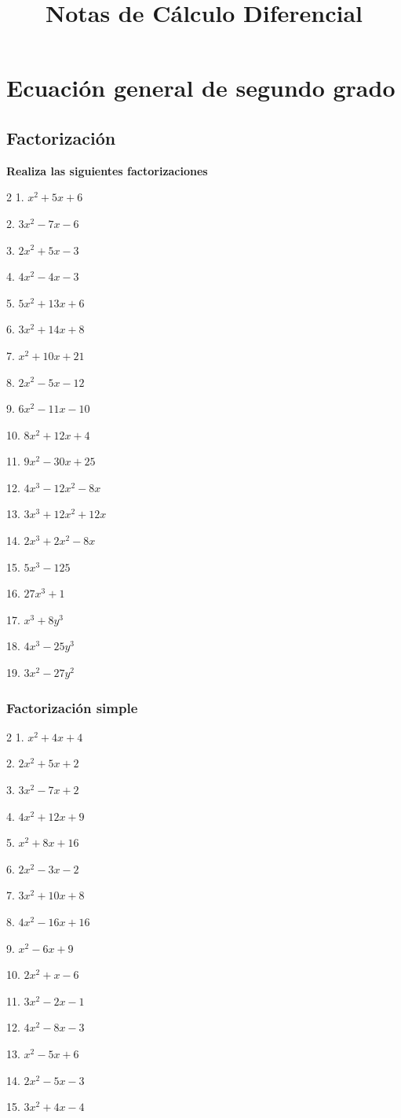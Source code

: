 \documentclass[12pt]{article}
\title{Notas de Cálculo Diferencial}
\author{}
\date{}
\begin{document}
\maketitle
\tableofcontents
\newpage

\section{Ecuación general de segundo
grado}\label{ecuaciuxf3n-general-de-segundo-grado}
\subsection{Factorización}\label{factorizaciuxf3n}
\textbf{Realiza las siguientes factorizaciones}

\begin{multicols}{2}
1. $x^2 + 5x + 6$

2. $3x^2 - 7x - 6$

3. $2x^2 + 5x - 3$

4. $4x^2 - 4x - 3$

5. $5x^2 + 13x + 6$

6. $3x^2 + 14x + 8$

7. $x^2 + 10x + 21$

8. $2x^2 - 5x - 12$

9. $6x^2 - 11x - 10$

10. $8x^2 + 12x + 4$

11. $9x^2 - 30x + 25$

12. $4x^3 - 12x^2 - 8x$


13. $3x^3 + 12x^2 + 12x$

14. $2x^3 + 2x^2 - 8x$

15. $5x^3 - 125$

16. $27x^3 + 1$

17. $x^3 + 8y^3$

18. $4x^3 - 25y^3$

19. $3x^2 - 27y^2$
\end{multicols}

\subsubsection{Factorización simple}\label{factorizaciuxf3n-simple}
\begin{multicols}{2}
1. $x^2 + 4x + 4$

2. $2x^2 + 5x + 2$

3. $3x^2 - 7x + 2$

4. $4x^2 + 12x + 9$

5. $x^2 + 8x + 16$

6. $2x^2 - 3x - 2$

7. $3x^2 + 10x + 8$

8. $4x^2 - 16x + 16$

9. $x^2 - 6x + 9$

10. $2x^2 + x - 6$

11. $3x^2 - 2x - 1$

12. $4x^2 - 8x - 3$

13. $x^2 - 5x + 6$

14. $2x^2 - 5x - 3$

15. $3x^2 + 4x - 4$
\end{multicols}
\end{document}

